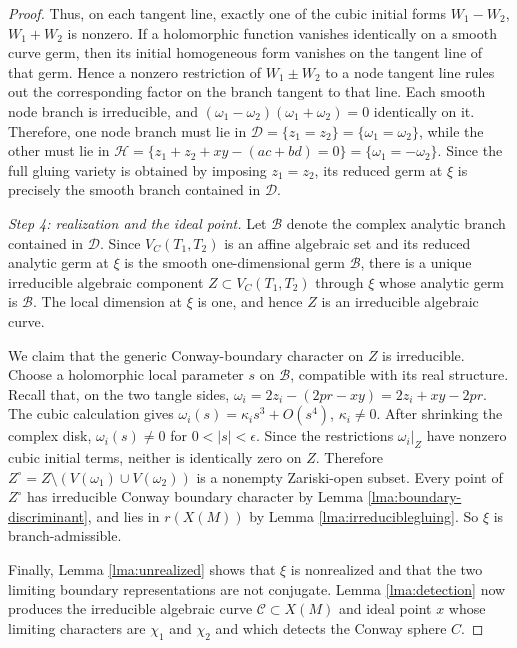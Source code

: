 \documentclass{article}
\theoremstyle{plain}
\theoremstyle{definition}
\theoremstyle{plain}
\theoremstyle{plain}
\theoremstyle{plain}
\theoremstyle{remark}
\theoremstyle{remark}
\theoremstyle{plain}
\theoremstyle{plain}
\theoremstyle{plain}
\theoremstyle{plain}
\begin{document}
\begin{proof}
\medskip

Thus, on each tangent line, exactly one of the cubic initial forms $W_1 - W_2$, $W_1 + W_2$ is nonzero. If a holomorphic function vanishes identically on a smooth curve germ, then its initial homogeneous form vanishes on the tangent line of that germ. Hence a nonzero restriction of $W_1 \pm W_2$ to a node tangent line rules out the corresponding factor on the branch tangent to that line. Each smooth node branch is irreducible, and $(\omega_1-\omega_2)(\omega_1+\omega_2) = 0$ identically on it. Therefore, one node branch must lie in $\mathcal D = \{z_1 = z_2\} = \{\omega_1 = \omega_2\}$, while the other must lie in $\mathcal H = \{z_1 + z_2 + xy - (ac + bd) = 0\} = \{\omega_1 = -\omega_2\}$. Since the full gluing variety is obtained by imposing $z_1 = z_2$, its reduced germ at $\xi$ is precisely the smooth branch contained in $\mathcal D$. 

\medskip

\emph{Step 4: realization and the ideal point.} Let $\mathcal B$ denote the complex analytic branch contained in $\mathcal D$. Since $V_C(T_1,T_2)$ is an affine algebraic set and its reduced analytic germ at $\xi$ is the smooth one-dimensional germ $\mathcal B$, there is a unique irreducible algebraic component $Z\subset V_C(T_1,T_2)$ through $\xi$ whose analytic germ is $\mathcal B$. The local dimension at $\xi$ is one, and hence $Z$ is an irreducible algebraic curve. 

\medskip

We claim that the generic Conway-boundary character on $Z$ is irreducible. Choose a holomorphic local parameter $s$ on $\mathcal B$, compatible with its real structure. Recall that, on the two tangle sides, $\omega_i = 2z_i-(2pr-xy) = 2z_i + xy - 2pr$. The cubic calculation gives $\omega_i(s) = \kappa_is^3 + O(s^4)$, $\kappa_i \neq 0$. After shrinking the complex disk, $\omega_i(s) \neq 0$ for $0 < |s| < \epsilon$. Since the restrictions $\omega_i|_Z$ have nonzero cubic initial terms, neither is identically zero on $Z$. Therefore $Z^\circ = Z \setminus (V(\omega_1) \cup V(\omega_2))$ is a nonempty Zariski-open subset. Every point of $Z^\circ$ has irreducible Conway boundary character by Lemma \ref{lma:boundary-discriminant}, and lies in $r(X(M))$ by Lemma \ref{lma:irreduciblegluing}. So $\xi$ is branch-admissible. 

\medskip

Finally, Lemma \ref{lma:unrealized} shows that $\xi$ is nonrealized and that the two limiting boundary representations are not conjugate. Lemma \ref{lma:detection} now produces the irreducible algebraic curve $\mathcal{C}\subset X(M)$ and ideal point $x$ whose limiting characters are $\chi_1$ and $\chi_2$ and which detects the Conway sphere $C$.
\end{proof}
\end{document}
